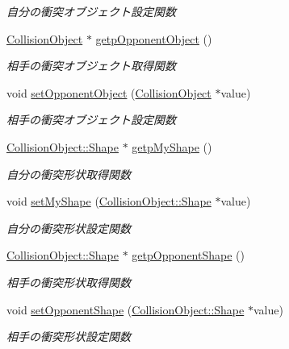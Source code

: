 \begin{DoxyCompactItemize}
\begin{DoxyCompactList}\small\item\em 自分の衝突オブジェクト設定関数 \end{DoxyCompactList}\item 
\mbox{\hyperlink{class_collision_object}{Collision\+Object}} $\ast$ \mbox{\hyperlink{class_collision_information_aecf0536a8fe6f6bf33f294d8ee9402e2}{getp\+Opponent\+Object}} ()
\begin{DoxyCompactList}\small\item\em 相手の衝突オブジェクト取得関数 \end{DoxyCompactList}\item 
void \mbox{\hyperlink{class_collision_information_ab2b701b11e80756b1910f71516e24ef8}{set\+Opponent\+Object}} (\mbox{\hyperlink{class_collision_object}{Collision\+Object}} $\ast$value)
\begin{DoxyCompactList}\small\item\em 相手の衝突オブジェクト設定関数 \end{DoxyCompactList}\item 
\mbox{\hyperlink{class_collision_object_1_1_shape}{Collision\+Object\+::\+Shape}} $\ast$ \mbox{\hyperlink{class_collision_information_a6776fe9ac5a0421cc96dcf1a7c83d5f2}{getp\+My\+Shape}} ()
\begin{DoxyCompactList}\small\item\em 自分の衝突形状取得関数 \end{DoxyCompactList}\item 
void \mbox{\hyperlink{class_collision_information_ad29cf44e98f3adde478d77a6887ba6ef}{set\+My\+Shape}} (\mbox{\hyperlink{class_collision_object_1_1_shape}{Collision\+Object\+::\+Shape}} $\ast$value)
\begin{DoxyCompactList}\small\item\em 自分の衝突形状設定関数 \end{DoxyCompactList}\item 
\mbox{\hyperlink{class_collision_object_1_1_shape}{Collision\+Object\+::\+Shape}} $\ast$ \mbox{\hyperlink{class_collision_information_afec0e3f4f686ac0fd1bea122495bdba9}{getp\+Opponent\+Shape}} ()
\begin{DoxyCompactList}\small\item\em 相手の衝突形状取得関数 \end{DoxyCompactList}\item 
void \mbox{\hyperlink{class_collision_information_a488caeec48c2327d3bb01c7884af688a}{set\+Opponent\+Shape}} (\mbox{\hyperlink{class_collision_object_1_1_shape}{Collision\+Object\+::\+Shape}} $\ast$value)
\begin{DoxyCompactList}\small\item\em 相手の衝突形状設定関数 \end{DoxyCompactList}\end{DoxyCompactItemize}
